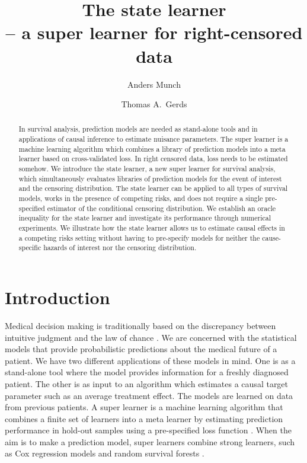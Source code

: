 \documentclass{statsoc}
\title[The state learner]{The state learner \\ {-- a super learner for right-censored data}}
\author{Anders Munch}
\author[Munch {\it et al.}]{Thomas A.\ Gerds}
\newcommand{\1}{\mathds{1}}
\begin{document}
\begin{abstract}
  In survival analysis, prediction models are needed as stand-alone
  tools and in applications of causal inference to estimate nuisance
  parameters. The super learner is a machine learning algorithm which
  combines a library of prediction models into a meta learner based on
  cross-validated loss. In right censored data, loss needs to be estimated somehow.
  We introduce the state learner, a new super learner for survival analysis, which
  simultaneously evaluates libraries
  of prediction models for the event of interest and the censoring
  distribution. The state learner can
be applied to all types of survival models, works in the presence
of competing risks, and does not require a single pre-specified
estimator of the conditional censoring distribution.
  We establish an oracle inequality for the state learner and
  investigate its performance through numerical experiments. We illustrate how
  the state learner allows us to estimate causal effects in a competing risks
  setting without having to pre-specify models for neither the cause-specific
  hazards of interest nor the censoring distribution.
\end{abstract}


\section{Introduction}
\label{sec:introduction}

Medical decision making is traditionally based on the discrepancy
between intuitive judgment and the law of chance
\citep{redelmeier1995probability}. We are concerned with the
statistical models that provide probabilistic predictions about the
medical future of a patient. We have two different applications of
these models in mind. One is as a stand-alone tool where the model
provides information for a freshly diagnosed patient. The other is as
input to an algorithm which estimates a causal target parameter such
as an average treatment effect. The models are learned on data from
previous patients. A super learner is a machine learning algorithm
that combines a finite set of learners into a meta learner by
estimating prediction performance in hold-out samples using a
pre-specified loss function \citep{van2007super}. When the aim is to
make a prediction model, super learners combine strong learners, such
as Cox regression models and random survival forests
\citep{gerds2021medical}.
\end{document}
